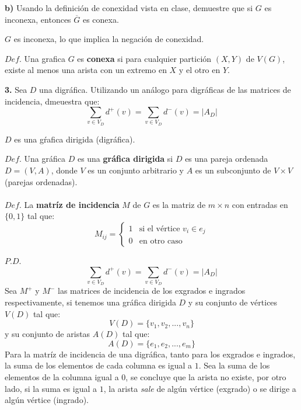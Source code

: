 \documentclass[12pt]{article}
\begin{document}
\textbf{b)} Usando la definición de conexidad vista en clase, demuestre que si $G$ es inconexa,
entonces $\overline{G}$ es conexa.
\begin{tcolorbox}[title=\textbf{Hipotesis}, colback=red!15!white, colframe=black!]
    $G$ es inconexa, lo que implica la negación de conexidad.
\end{tcolorbox}
\begin{tcolorbox}[title=\textbf{Definiciones}, colback=blue!15!white, colframe=black!]
    $Def$. Una grafica $G$ es \textbf{conexa} si para cualquier partición $(X,Y)$ de $V(G)$, existe al menos una arista con un extremo
    en $X$ y el otro en $Y$.
\end{tcolorbox}

\vspace{1cm}

%
%
\textbf{3.} Sea $D$ una digráfica. Utilizando un análogo para digráficas de las matrices de incidencia, dmeuestra que:\\
\[
\sum_{\displaystyle v \in V_D} d^{+}(v) = \sum_{\displaystyle v \in V_D} d^{-}(v) = |A_D|
\]
\begin{tcolorbox}[title=\textbf{Hipotesis}, colback=red!15!white, colframe=black!]
    $D$ es una gŕafica dirigida (digráfica).
\end{tcolorbox}
\begin{tcolorbox}[title=\textbf{Definiciones}, colback=blue!15!white, colframe=black!]
    $Def$. Una gráfica $D$ es una \textbf{gráfica dirigida} si $D$ es una pareja ordenada $D=(V,A)$, donde
    $V$ es un conjunto arbitrario y $A$ es un subconjunto de $V \times V$ (parejas ordenadas).
    \\
    \\
    $Def$. La \textbf{matríz de incidencia} $M$ de $G$ es la matriz de $m \times n$ con entradas en $\{0, 1\}$ tal que:
    \[M_{ij} = \begin{cases} 1 & \text{si el vértice } v_i \in e_j\\ 0 & \text{en otro caso} \end{cases}\]

\end{tcolorbox}

$P.D.$
\[\sum_{\displaystyle v \in V_D} d^{+}(v) = \sum_{\displaystyle v \in V_D} d^{-}(v) = |A_D|\]
Sea $M^+$ y $M^-$ las matrices de incidencia de los exgrados e ingrados respectivamente, si tenemos una gráfica dirigida $D$ y su conjunto
de vértices $V(D)$ tal que:
\[V(D) = \{v_1, v_2, ..., v_n\}\]
y su conjunto de aristas $A(D)$ tal que:
\[A(D) = \{e_1, e_2, ..., e_m\}\]
Para la matríz de incidencia de una digráfica, tanto para los exgrados e ingrados, la suma
de los elementos de cada columna es igual a $1$. Sea la suma de los elementos de la columna igual a $0$,
se concluye que la arista no existe, por otro lado, si la suma es igual a $1$, la arista \textit{sale} de algún vértice (exgrado)
o se dirige a algún vértice (ingrado).\\
\end{document}
